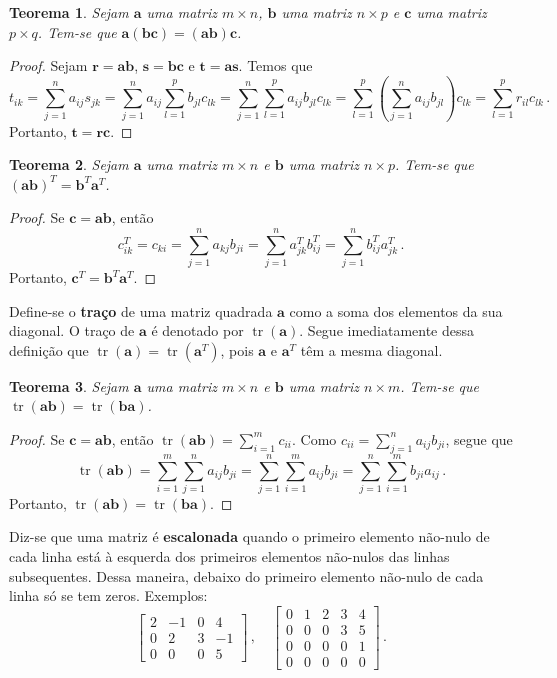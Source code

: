 \documentclass[12pt,a4paper]{report}
\newcommand{\tb}{\textbf}
\newcommand{\mb}{\mathbf}
\newcommand{\dpar}[1]{\left(#1\right)}
\newtheorem{thm}{Teorema}[chapter]
\DeclareMathOperator{\tr}{tr}
\begin{document}
\begin{thm}
  Sejam $\mb a$ uma matriz $m\times n$, $\mb b$ uma matriz $n\times p$ e $\mb c$ uma matriz $p\times q$. Tem-se que $\mb a(\mb {bc})=(\mb{ab})\mb c$.
\end{thm}
\begin{proof}
  Sejam $\mb r=\mb{ab}$, $\mb s=\mb {bc}$ e $\mb t=\mb {as}$. Temos que
  $$t_{ik}=\sum_{j=1}^na_{ij}s_{jk}=\sum_{j=1}^na_{ij}\sum_{l=1}^pb_{jl}c_{lk}=\sum_{j=1}^n\sum_{l=1}^pa_{ij}b_{jl}c_{lk}=\sum_{l=1}^p\dpar{\sum_{j=1}^na_{ij}b_{jl}}c_{lk}=\sum_{l=1}^pr_{il}c_{lk}\,.$$
  Portanto, $\mb t=\mb {rc}$.
\end{proof}

\begin{thm}
  Sejam $\mb a$ uma matriz $m\times n$ e $\mb b$ uma matriz $n\times p$. Tem-se que $(\mb a\mb b)^T=\mb b^T\mb a^T$.
\end{thm}
\begin{proof}
  Se $\mb c=\mb {ab}$, então
  $$c^T_{ik}=c_{ki}=\sum_{j=1}^na_{kj}b_{ji}=\sum_{j=1}^na_{jk}^Tb_{ij}^T=\sum_{j=1}^nb_{ij}^Ta_{jk}^T\,.$$
  Portanto, $\mb c^T=\mb b^T\mb a^T$.
\end{proof}

Define-se o \tb{traço} de uma matriz quadrada $\mb a$ como a soma dos elementos da sua diagonal. O traço de $\mb a$ é denotado por $\tr(\mb a)$. Segue imediatamente dessa definição que $\tr(\mb a)=\tr(\mb a^T)$, pois $\mb a$ e $\mb a^T$ têm a mesma diagonal.

\begin{thm}
  Sejam $\mb a$ uma matriz $m\times n$ e $\mb b$ uma matriz $n\times m$. Tem-se que $\tr(\mb {ab})=\tr(\mb{ba})$.
\end{thm}
\begin{proof}
  Se $\mb c=\mb a\mb b$, então $\tr(\mb {ab})=\sum_{i=1}^m c_{ii}$. Como $c_{ii}=\sum_{j=1}^na_{ij}b_{ji}$, segue que
  $$\tr(\mb{ab})=\sum_{i=1}^m\sum_{j=1}^na_{ij}b_{ji}=\sum_{j=1}^n\sum_{i=1}^ma_{ij}b_{ji}=\sum_{j=1}^n\sum_{i=1}^mb_{ji}a_{ij}\,.$$
  Portanto, $\tr(\mb{ab})=\tr(\mb{ba})$.
\end{proof}

Diz-se que uma matriz é \tb{escalonada} quando o primeiro elemento não-nulo de cada linha está à esquerda dos primeiros elementos não-nulos das linhas subsequentes. Dessa maneira, debaixo do primeiro elemento não-nulo de cada linha só se tem zeros. Exemplos:
$$\begin{bmatrix}
  2&-1&0&4\\
  0&2&3&-1\\
  0&0&0&5
\end{bmatrix}\,,\quad \begin{bmatrix}
  0&1&2&3&4\\
  0&0&0&3&5\\
  0&0&0&0&1\\
  0&0&0&0&0
\end{bmatrix}\,.$$
\end{document}

